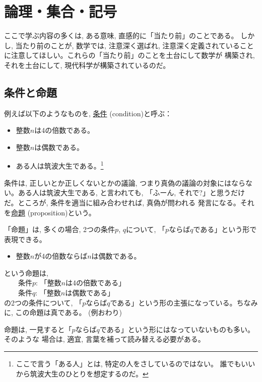 \chapter{論理・集合・記号}\label{chapt_logic}

{\small ここで学ぶ内容の多くは, ある意味, 直感的に「当たり前」のことである。
しかし, 当たり前のことが, 数学では, 注意深く選ばれ, 注意深く定義されていること
に注意してほしい。これらの「当たり前」のことを土台にして数学が
構築され, それを土台にして, 現代科学が構築されているのだ。\\}

\section{条件と命題}

例えば以下のようなものを, \underline{条件} (condition)と呼ぶ：
\begin{itemize}
\item 整数$n$は4の倍数である。
\item 整数$n$は偶数である。
\item ある人は筑波大生である。\footnote{ここで言う「ある人」とは, 特定の人をさしているのではない。
誰でもいいから筑波大生のひとりを想定するのだ。}
\end{itemize}
条件は, 正しいとか正しくないとかの議論, つまり真偽の議論の対象にはならない。ある人は筑波大生である, 
と言われても, 「ふーん, それで?」と思うだけだ。ところが, 条件を適当に組み合わせれば, 真偽が問われる
発言になる。それを\underline{命題} (proposition)という。

「命題」は, 多くの場合, 2つの条件$p$, $q$について, 「$p$ならば$q$である」という形で表現できる。
\begin{exmpl}\label{ex:logic1}
\begin{itemize}
\item 整数$n$が4の倍数ならば$n$は偶数である。
\end{itemize}
という命題は, \\
　　条件$p$: 「整数$n$は4の倍数である」\\
　　条件$q$: 「整数$n$は偶数である」\\
の2つの条件について, 「$p$ならば$q$である」という形の主張になっている。ちなみに, この命題は真である。
(例おわり)\end{exmpl}
\mv

命題は, 一見すると「$p$ならば$q$である」という形にはなっていないものも多い。そのような
場合は, 適宜, 言葉を補って読み替える必要がある。\mv

